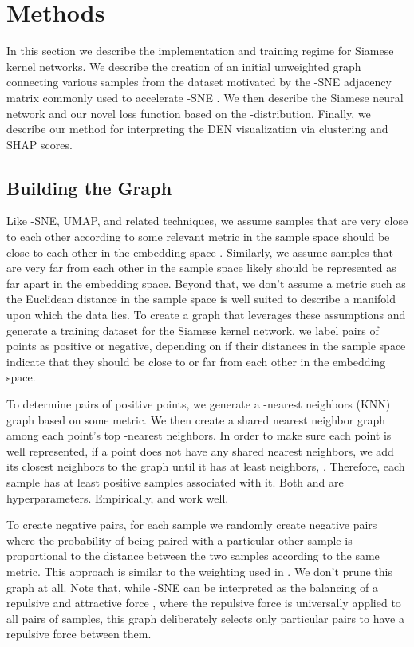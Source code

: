 \documentclass{article}
\begin{document}
\section{Methods}

In this section we describe the implementation and training regime for Siamese kernel networks. We describe the creation of an initial unweighted graph connecting various samples from the dataset motivated by the -SNE adjacency matrix commonly used to accelerate -SNE \cite{linderman2019fast}. We then describe the Siamese neural network and our novel loss function based on the -distribution. Finally, we describe our method for interpreting the DEN visualization via clustering and SHAP scores.

\subsection{Building the Graph}

Like -SNE, UMAP, and related techniques, we assume samples that are very close to each other according to some relevant metric in the sample space should be close to each other in the embedding space \cite{maaten2008visualizing, 2018arXivUMAP}. Similarly, we assume samples that are very far from each other in the sample space likely should be represented as far apart in the embedding space. Beyond that, we don't assume a metric such as the Euclidean distance in the sample space is well suited to describe a manifold upon which the data lies. To create a graph that leverages these assumptions and generate a training dataset for the Siamese kernel network, we label pairs of points as positive or negative, depending on if their distances in the sample space indicate that they should be close to or far from each other in the embedding space.

To determine pairs of positive points, we generate a -nearest neighbors (KNN) graph based on some metric. We then create a shared nearest neighbor graph \cite{ertoz2002new} among each point's top -nearest neighbors. In order to make sure each point is well represented, if a point does not have any shared nearest neighbors, we add its closest neighbors to the graph until it has at least  neighbors, . Therefore, each sample has at least  positive samples associated with it. Both  and  are hyperparameters. Empirically,  and  work well.

To create negative pairs, for each sample we randomly create  negative pairs where the probability of being paired with a particular other sample is proportional to the distance between the two samples according to the same metric. This approach is similar to the  weighting used in \cite{arthur2006k}. We don't prune this graph at all. Note that, while -SNE can be interpreted as the balancing of a repulsive and attractive force \cite{maaten2008visualizing}, where the repulsive force is universally applied to all pairs of samples, this graph deliberately selects only particular pairs to have a repulsive force between them.
\end{document}
